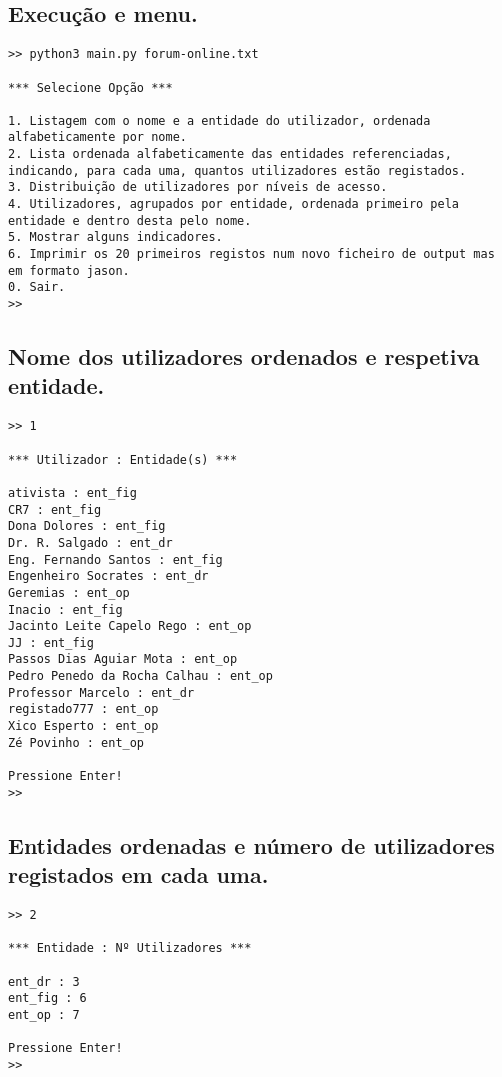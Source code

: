 \documentclass[11pt,a4paper]{report}%
\begin{document}
\subsection{Execução e menu.}
\begin{small}
\begin{verbatim}
>> python3 main.py forum-online.txt

*** Selecione Opção ***

1. Listagem com o nome e a entidade do utilizador, ordenada alfabeticamente por nome.
2. Lista ordenada alfabeticamente das entidades referenciadas, indicando, para cada uma, quantos utilizadores estão registados.
3. Distribuição de utilizadores por níveis de acesso.
4. Utilizadores, agrupados por entidade, ordenada primeiro pela entidade e dentro desta pelo nome.
5. Mostrar alguns indicadores.
6. Imprimir os 20 primeiros registos num novo ficheiro de output mas em formato jason.
0. Sair.
>> 
\end{verbatim}
\end{small}

\subsection{Nome dos utilizadores ordenados e respetiva entidade.}

\begin{verbatim}
>> 1

*** Utilizador : Entidade(s) ***

ativista : ent_fig
CR7 : ent_fig
Dona Dolores : ent_fig
Dr. R. Salgado : ent_dr
Eng. Fernando Santos : ent_fig
Engenheiro Socrates : ent_dr
Geremias : ent_op
Inacio : ent_fig
Jacinto Leite Capelo Rego : ent_op
JJ : ent_fig
Passos Dias Aguiar Mota : ent_op
Pedro Penedo da Rocha Calhau : ent_op
Professor Marcelo : ent_dr
registado777 : ent_op
Xico Esperto : ent_op
Zé Povinho : ent_op

Pressione Enter!
>> 
\end{verbatim}


\subsection{Entidades ordenadas e número de utilizadores registados em cada uma.}

\begin{verbatim}
>> 2

*** Entidade : Nº Utilizadores ***

ent_dr : 3
ent_fig : 6
ent_op : 7

Pressione Enter!
>> 
\end{verbatim}
\end{document}
